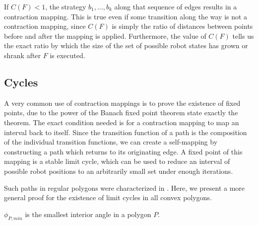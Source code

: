 \documentclass[]{styles/svproc}  %
\begin{document}
If $C(F) < 1$, the strategy $b_1, \ldots, b_k$ along that sequence of edges
results in a contraction mapping. This is true even if some transition along
the way is not a
contraction mapping, since $C(F)$ is simply the ratio of distances
between points before and after the mapping is applied. Furthermore, the value
of $C(F)$ tells us the exact ratio by which the
size of the set of possible robot states has grown or shrank after $F$ is
executed.


\subsection{Cycles} \label{sec:cycles}

A very common use of contraction mappings is to prove the existence of fixed
points, due to the power of the Banach fixed point theorem \cite{Granas2003}
{\color{red} state exactly the theorem}.
The exact condition needed is for a contraction mapping to map an interval back
to itself. Since the transition function of a path is the
composition of the individual transition functions, we can create a self-mapping 
by constructing a path which returns to its originating edge. A fixed
point of this mapping is a stable limit cycle, which can be used to reduce an
interval of possible robot positions to an arbitrarily small set under enough
iterations.

Such paths in regular polygons were characterized in \cite{NilBecLav17}.
Here, we present a more general proof for the existence of limit cycles in all
convex polygons.


\begin{definition}
$\phi_{P,min}$ is the smallest interior angle in a polygon $P$.
\end{definition}
\end{document}
